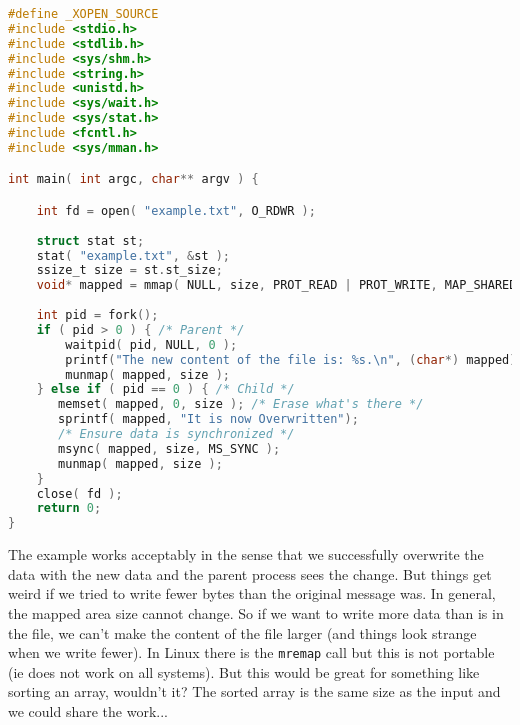\begin{lstlisting}[language=C]
#define _XOPEN_SOURCE
#include <stdio.h>
#include <stdlib.h>
#include <sys/shm.h>
#include <string.h>
#include <unistd.h>
#include <sys/wait.h>
#include <sys/stat.h>
#include <fcntl.h>
#include <sys/mman.h>

int main( int argc, char** argv ) { 

    int fd = open( "example.txt", O_RDWR );
    
    struct stat st; 
    stat( "example.txt", &st );
    ssize_t size = st.st_size;
    void* mapped = mmap( NULL, size, PROT_READ | PROT_WRITE, MAP_SHARED, fd, 0 );  
    
    int pid = fork();
    if ( pid > 0 ) { /* Parent */
        waitpid( pid, NULL, 0 );
        printf("The new content of the file is: %s.\n", (char*) mapped);
        munmap( mapped, size );
    } else if ( pid == 0 ) { /* Child */
       memset( mapped, 0, size ); /* Erase what's there */
       sprintf( mapped, "It is now Overwritten");
       /* Ensure data is synchronized */
       msync( mapped, size, MS_SYNC );
       munmap( mapped, size );
    }
    close( fd );
    return 0;
}
\end{lstlisting}

The example works acceptably in the sense that we successfully overwrite the data with the new data and the parent process sees the change. But things get weird if we tried to write fewer bytes than the original message was. In general, the mapped area size cannot change. So if we want to write more data than is in the file, we can't make the content of the file larger (and things look strange when we write fewer). In Linux there is the \texttt{mremap} call but this is not portable (ie does not work on all systems). But this would be great for something like sorting an array, wouldn't it? The sorted array is the same size as the input and we could share the work...



